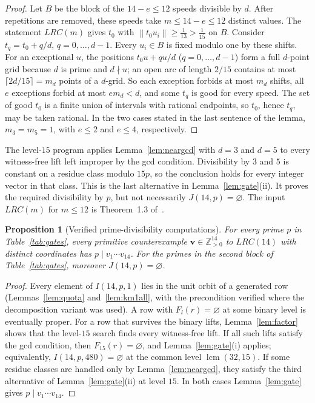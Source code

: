 \documentclass[11pt]{article}
\newtheorem{proposition}[theorem]{Proposition}
\theoremstyle{definition}
\theoremstyle{remark}
\newcommand{\Z}{\mathbb{Z}}
\newcommand{\vct}[1]{\mathbf{#1}}
\newcommand{\nearest}[1]{\left\lVert #1\right\rVert}
\DeclareMathOperator{\lcm}{lcm}
\begin{document}
\begin{proof}
Let $B$ be the block of the $14-e\leq12$ speeds divisible by $d$.  After
repetitions are removed, these speeds take $m\leq14-e\leq12$ distinct
values.  The statement $LRC(m)$ gives $t_0$ with
$\nearest{t_0u_i}\geq\frac1{13}>\frac1{15}$ on $B$.  Consider
$t_q=t_0+q/d$, $q=0,\ldots,d-1$.  Every $u_i\in B$ is fixed modulo one by
these shifts.  For an exceptional $u$, the positions $t_0u+qu/d$
($q=0,\ldots,d-1$) form a full $d$-point grid because $d$ is prime and
$d\nmid u$; an open arc of length $2/15$ contains at most
$\lceil2d/15\rceil=m_d$ points of a $d$-grid.  So each exception forbids
at most $m_d$ shifts, all $e$ exceptions forbid at most $em_d<d$, and some
$t_q$ is good for every speed.  The set of good $t_0$ is a finite union of
intervals with rational endpoints, so $t_0$, hence $t_q$, may be taken
rational.  In the two cases stated in the last sentence of the lemma,
$m_3=m_5=1$, with $e\leq2$ and $e\leq4$, respectively.
\end{proof}

The level-$15$ program applies Lemma~\ref{lem:neargcd} with $d=3$ and
$d=5$ to every witness-free lift left improper by the gcd condition.
Divisibility by $3$ and $5$ is constant on a residue class modulo $15p$,
so the conclusion holds for every integer vector in that class.  This is
the last alternative in Lemma~\ref{lem:gate}(ii).  It proves the required
divisibility by $p$, but not necessarily $J(14,p)=\varnothing$.  The input
$LRC(m)$ for $m\leq12$ is Theorem~1.3 of~\cite{ST26}.

\begin{proposition}[Verified prime-divisibility computations]\label{prop:closure}
For every prime $p$ in Table~\ref{tab:gates}, every primitive
counterexample $\vct{v}\in\Z_{>0}^{14}$ to $LRC(14)$ with distinct
coordinates has $p\mid v_1\cdots v_{14}$.  For the primes in the second
block of Table~\ref{tab:gates}, moreover $J(14,p)=\varnothing$.
\end{proposition}

\begin{proof}
Every element of $I(14,p,1)$ lies in the unit orbit of a generated row
(Lemmas~\ref{lem:quota} and~\ref{lem:km1all}, with the precondition
verified where the decomposition variant was used).  A row with
$F_l(r)=\varnothing$ at some binary level is eventually proper.  For a
row that survives the binary lifts, Lemma~\ref{lem:factor} shows that the
level-$15$ search finds every witness-free lift.  If all such lifts satisfy
the gcd condition, then $F_{15}(r)=\varnothing$, and
Lemma~\ref{lem:gate}(i) applies; equivalently,
$I(14,p,480)=\varnothing$ at the common level $\lcm(32,15)$.  If some
residue classes are handled only by Lemma~\ref{lem:neargcd}, they satisfy
the third alternative of Lemma~\ref{lem:gate}(ii) at level $15$.  In both
cases Lemma~\ref{lem:gate} gives $p\mid v_1\cdots v_{14}$.
\end{proof}
\end{document}
